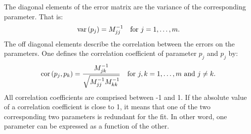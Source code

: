 \documentclass[twoside]{book}
\begin{document}
The diagonal elements of the error matrix are the variance of the
corresponding parameter. That is:
\begin{equation}
\mathop{\rm var}\left(p_j\right)=M_{jj}^{-1}\mbox{\quad for $j=1,\ldots,m$}.
\end{equation}
The off diagonal elements describe the correlation between the
errors on the parameters. One defines the correlation coefficient
of parameter $p_j$ and $p_j$ by:
\begin{equation}
  \mathop{\rm cor}\left(p_j,p_k\right)={\displaystyle M_{jk}^{-1}
  \over\displaystyle\sqrt{M_{jj}^{-1}M_{kk}^{-1}}}\mbox{\quad for
$j,k=1,\ldots,m$ and $j\ne k$}.
\end{equation}
All correlation coefficients are comprised between -1 and 1. If
the absolute value of a correlation coefficient is close to 1, it
means that one of the two corresponding two parameters is
redundant for the fit. In other word, one parameter can be
expressed as a function of the other.
\end{document}
